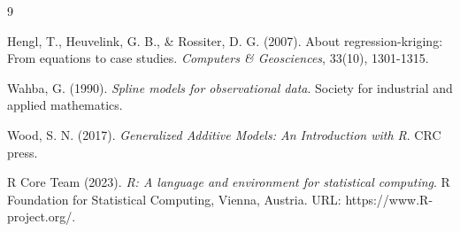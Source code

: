 \documentclass[twoside]{article}
\begin{document}
\begin{thebibliography}{9}

Hengl, T., Heuvelink, G. B., \& Rossiter, D. G. (2007). About regression-kriging: From equations to case studies. {\it Computers \& Geosciences}, 33(10), 1301-1315.

Wahba, G. (1990). {\it Spline models for observational data}. Society for industrial and applied mathematics.

Wood, S. N. (2017). {\it Generalized Additive Models: An Introduction with R}. CRC press.

R Core Team (2023). {\it R: A language and environment for statistical computing}. R Foundation for Statistical Computing, Vienna, Austria. URL: https://www.R-project.org/.
\end{thebibliography}
\end{document}
